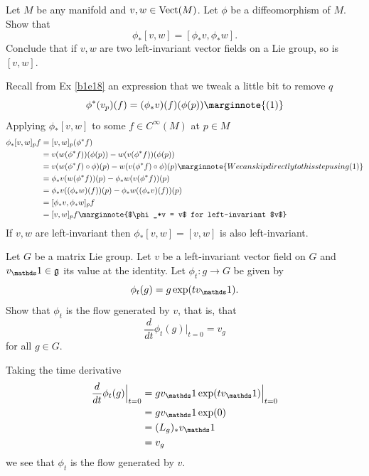 \documentclass[10pt]{article}
\begin{document}
\begin{example}\label{b2e46}
	Let $M$ be any manifold and $v,w\in\text{Vect}(M)$. Let $\phi$ be a diffeomorphism of $M$. Show that
	$$
	\phi_*[v,w]=[\phi_*v,\phi_*w].
	$$
	Conclude that if $v,w$ are two left-invariant vector fields on a Lie group, so is $[v,w]$.
\end{example}
\sol Recall from Ex \ref{b1e18} an expression that we tweak a little bit to remove $q$
$$
\phi^*(v_p)(f) = (\phi_*v)(f)(\phi(p))\marginnote{(1)}
$$
Applying $\phi_*[v,w]$ to some $f\in C^\infty(M)$ at $p \in M$
$$
\begin{aligned}
	\phi_*[v,w]_pf &= [v,w]_p(\phi^*f)\\
	&= v(w(\phi^*f))(\phi(p)) - w(v(\phi^*f))(\phi(p))\\
	&= v(w(\phi^*f)\circ\phi)(p) - w(v(\phi^*f)\circ\phi)(p)\marginnote{We can skip directly to this step using (1)}\\
	&= \phi_*v(w(\phi^*f))(p) - \phi_*w(v(\phi^*f))(p)\\
	&= \phi_*v((\phi_*w)(f))(p) - \phi_*w((\phi_*v)(f))(p)\\
	&= [\phi_*v,\phi_*w]_pf\\
	&= [v,w]_pf\marginnote{$\phi_*v = v$ for left-invariant $v$}
\end{aligned}
$$
If $v,w$ are left-invariant then $\phi_*[v,w] = [v, w]$ is also left-invariant.


\begin{example}\label{b2e47}
	Let $G$ be a matrix Lie group. Let $v$ be a left-invariant vector field on $G$ and $v_\id\in\mf{g}$ its value at the identity. Let $\phi_t:g\to G$ be given by
	$$
	\phi_t(g)=g\exp(tv_\id).
	$$
	Show that $\phi_t$ is the flow generated by $v$, that is, that
	$$
	\frac{d}{dt}\phi_t(g)\Big|_{t=0}=v_g
	$$
	for all $g\in G$.
\end{example}
\sol Taking the time derivative
$$
\begin{aligned}
	\frac{d}{dt}\phi_t(g)\Big|_{t=0} &= gv_\id\exp(tv_\id)\Big|_{t=0}\\
	&= gv_\id\exp(0)\\
	&= (L_g)_*v_\id\\
	&= v_g
\end{aligned}
$$
we see that $\phi_t$ is the flow generated by $v$.
\end{document}
